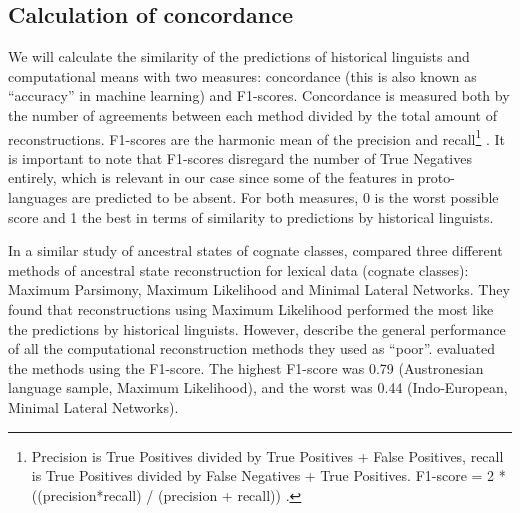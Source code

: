 \documentclass[a4paper,10pt]{article} %
\begin{document}
 
\subsection{Calculation of concordance}
\label{result_calc_section}
We will calculate the similarity of the predictions of historical linguists and computational means with two measures: concordance (this is also known as ``accuracy'' in machine learning) and F1-scores. Concordance is measured both by the number of agreements between each method divided by the total amount of reconstructions. F1-scores are the harmonic mean of the precision and recall\footnote{Precision is True Positives divided by True Positives + False Positives, recall is True Positives divided by False Negatives + True Positives. F1-score = 2 * ((precision*recall) / (precision + recall)) \citep{van1979information}.} \citep[133]{van1979information}. It is important to note that F1-scores disregard the number of True Negatives entirely, which is relevant in our case since some of the features in proto-languages are predicted to be absent. For both measures, 0 is the worst possible score and 1 the best in terms of similarity to predictions by historical linguists. 

In a similar study of ancestral states of cognate classes, \citet{jager2018using} compared three different methods of ancestral state reconstruction for lexical data (cognate classes): Maximum Parsimony, Maximum Likelihood and Minimal Lateral Networks. They found that reconstructions using Maximum Likelihood performed the most like the predictions by historical linguists. However, \citet{jager2018using} describe the general performance of all the computational reconstruction methods they used as ``poor''.  \citet{jager2018using} evaluated the methods using the F1-score. The highest F1-score was 0.79 (Austronesian language sample, Maximum Likelihood), and the worst was 0.44 (Indo-European, Minimal Lateral Networks).

\end{document}
